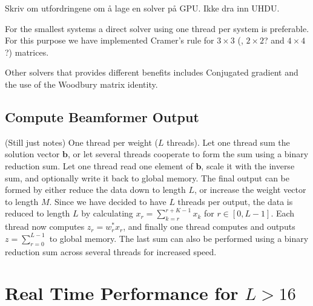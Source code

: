 \documentclass[journal]{IEEEtran}
\newcommand{\mat}[1]{\mathbf{#1}}
\renewcommand{\vec}[1]{\mathbf{#1}}
\begin{document}

Skriv om utfordringene om å lage en solver på GPU. Ikke dra inn UHDU.

For the smallest systems a direct solver using one thread per system is preferable. For this purpose we have implemented Cramer's rule for $3 \times 3$ (, $2 \times 2$?  and $4 \times 4$?) matrices.

Other solvers that provides different benefits includes Conjugated gradient and the use of the Woodbury matrix identity. 

\subsection{Compute Beamformer Output}
(Still just notes) One thread per weight ($L$ threads). Let one thread sum the solution vector $\vec{b}$, or let several threads cooperate to form the sum using a binary reduction sum.
Let one thread read one element of $\vec{b}$, scale it with the inverse sum, and optionally write it back to global memory. The final output can be formed by either reduce the data down to length $L$, or increase the weight vector to length $M$. Since we have decided to have $L$ threads per output, the data is reduced to length $L$ by calculating $x_{r} = \sum_{k=r}^{r+K-1}x_{k}$ for $r \in [0, L-1]$. Each thread now computes $z_r = w_r^*x_r$, and finally one thread computes and outputs $z = \sum_{r=0}^{L-1}$ to global memory. The last sum can also be performed using a binary reduction sum across several threads for increased speed.

\section{Real Time Performance for $L > 16$}\label{sec:meth2}
\end{document}
